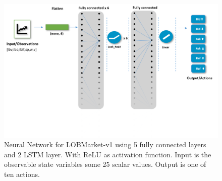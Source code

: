 \documentclass{kththesis}
\theoremstyle{definition}
\begin{document}
\begin{figure}[H]
    \centering
    \includegraphics[scale=.5]{Imgs/nna1.png}
    \caption{Neural Network for LOBMarket-v1 using 5 fully connected layers and 2 LSTM layer. With ReLU as activation function. Input is the observable state variables some 25 scalar values. Output is one of ten actions.}
    \label{fig:e4}
\end{figure}
\end{document}
